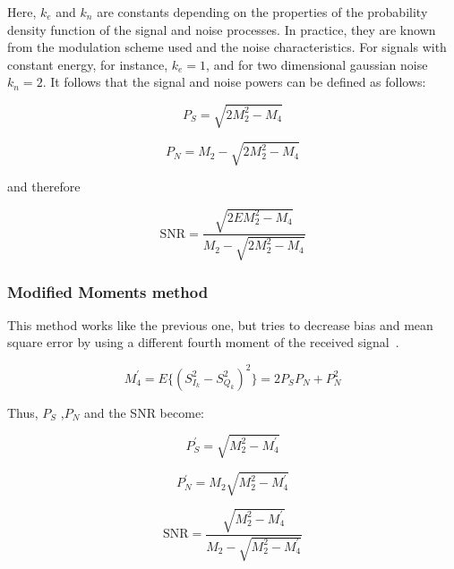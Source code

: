 \begin{refsection}
Here, $k_e$ and $k_n$ are constants depending on the properties of the
probability density function of the signal and noise processes. In practice,
they are known from the modulation scheme used and the noise characteristics.
For signals with constant energy, for instance, $k_e = 1$, and for two
dimensional gaussian noise $k_n = 2$.
It follows that the signal and noise powers can be defined as follows: 

\begin{equation}
	P_S = \sqrt{2 M_2^2 - M_ 4}
\end{equation}

\begin{equation}
	P_N = M_2 - \sqrt{2 M_2^2 - M_ 4}
\end{equation}

and therefore

\begin{equation}
	\text{SNR} = \frac{\sqrt{2EM_2^2 - M_4}}{M_2 - \sqrt{2M_2^2 - M_4}}
\end{equation}

\subsubsection*{Modified Moments method}

\indent This method works like the previous one, but tries to decrease bias and mean
square error by using a different fourth moment of the received
signal~\cite{ren05}.

\begin{equation}
	M^\prime_{4} = E\{(S^2_{I_k} - S^2_{Q_k})^2\} = 2 P_S P_N + P_N^2
\end{equation}

Thus, $P_S$ ,$P_N$ and the SNR become:

\begin{equation}
	P^\prime_S = \sqrt{M^2_2 - M^\prime_4}
\end{equation}

\begin{equation}
	P^\prime_N = M_2 \sqrt{M^2_2 - M^\prime_4}
\end{equation}

\begin{equation}
	\text{SNR} = \frac{\sqrt{M_2^2 - M^\prime_4}}{M_2 - \sqrt{M_2^2 - M^\prime_4}}
\end{equation}



\end{refsection}
